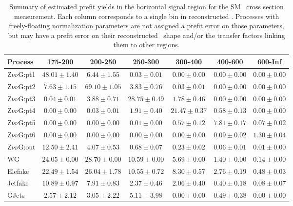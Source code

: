 \begin{table}[htbp]
  \begin{center}
    \caption{Summary of estimated prefit yields in the horizontal signal region for the SM \zinvg\ cross section measurement.
    Each column corresponds to a single bin in reconstructed \ETgamma. Processes with freely-floating normalization parameters
    are not assigned a prefit error on those parameters, but may have a prefit error on their reconstructed \ETgamma\ shape
    and/or the transfer factors linking them to other regions.}
    \label{tab:BkgSummary_below0p5_prefit}
    \begin{tabular}{|l|c|c|c|c|c|c|}
      \hline
      Process & 175-200 & 200-250 & 250-300 & 300-400 & 400-600 & 600-Inf \\
      \hline
      Z$\nu\nu$G:pt1 & $48.01{\pm}1.40$ & $6.44{\pm}1.55$ & $0.03{\pm}0.01$ & $0.00{\pm}0.00$ & $0.00{\pm}0.00$ & $0.00{\pm}0.00$ \\
      Z$\nu\nu$G:pt2 & $7.63{\pm}1.15$ & $69.10{\pm}1.05$ & $3.83{\pm}0.76$ & $0.03{\pm}0.01$ & $0.00{\pm}0.00$ & $0.00{\pm}0.00$ \\
      Z$\nu\nu$G:pt3 & $0.04{\pm}0.01$ & $3.88{\pm}0.71$ & $28.75{\pm}0.49$ & $1.78{\pm}0.46$ & $0.00{\pm}0.00$ & $0.00{\pm}0.00$ \\
      Z$\nu\nu$G:pt4 & $0.00{\pm}0.00$ & $0.03{\pm}0.01$ & $1.91{\pm}0.40$ & $21.47{\pm}0.37$ & $0.58{\pm}0.13$ & $0.00{\pm}0.00$ \\
      Z$\nu\nu$G:pt5 & $0.00{\pm}0.00$ & $0.00{\pm}0.00$ & $0.01{\pm}0.00$ & $0.57{\pm}0.12$ & $7.81{\pm}0.17$ & $0.07{\pm}0.02$ \\
      Z$\nu\nu$G:pt6 & $0.00{\pm}0.00$ & $0.00{\pm}0.00$ & $0.00{\pm}0.00$ & $0.00{\pm}0.00$ & $0.09{\pm}0.02$ & $1.30{\pm}0.04$ \\
      Z$\nu\nu$G:out & $12.50{\pm}2.41$ & $4.07{\pm}0.53$ & $0.68{\pm}0.07$ & $0.23{\pm}0.02$ & $0.06{\pm}0.01$ & $0.01{\pm}0.00$ \\
      WG & $24.05{\pm}0.00$ & $28.70{\pm}0.00$ & $10.59{\pm}0.00$ & $5.69{\pm}0.00$ & $1.40{\pm}0.00$ & $0.14{\pm}0.00$ \\
      Elefake & $22.49{\pm}1.54$ & $26.04{\pm}1.78$ & $10.55{\pm}0.72$ & $8.30{\pm}0.57$ & $2.76{\pm}0.19$ & $0.48{\pm}0.03$ \\
      Jetfake & $10.89{\pm}0.97$ & $7.91{\pm}0.83$ & $2.37{\pm}0.46$ & $2.06{\pm}0.40$ & $0.40{\pm}0.18$ & $0.08{\pm}0.07$ \\
      GJets & $2.57{\pm}2.12$ & $3.05{\pm}2.22$ & $5.11{\pm}3.98$ & $0.00{\pm}0.00$ & $0.49{\pm}0.38$ & $0.00{\pm}0.00$ \\

\end{tabular}
\end{center}
\end{table}

